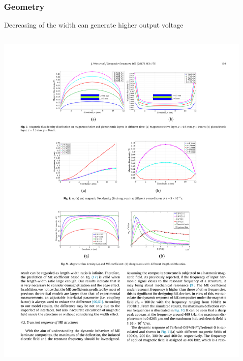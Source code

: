 \documentclass[compress]{beamer}
\begin{document}
\begin{frame}\frametitle{Geometry}
Decreasing of the width can generate higher output voltage
\begin{columns}[totalwidth=\textwidth]
 \begin{column}{.55\textwidth}
 \includegraphics[width=0.99\textwidth]{Graphic/03_LTref1.pdf}
 \end{column}
 \begin{column}{.25\textwidth}

\end{column}
\end{columns}
\end{frame}
\end{document}
